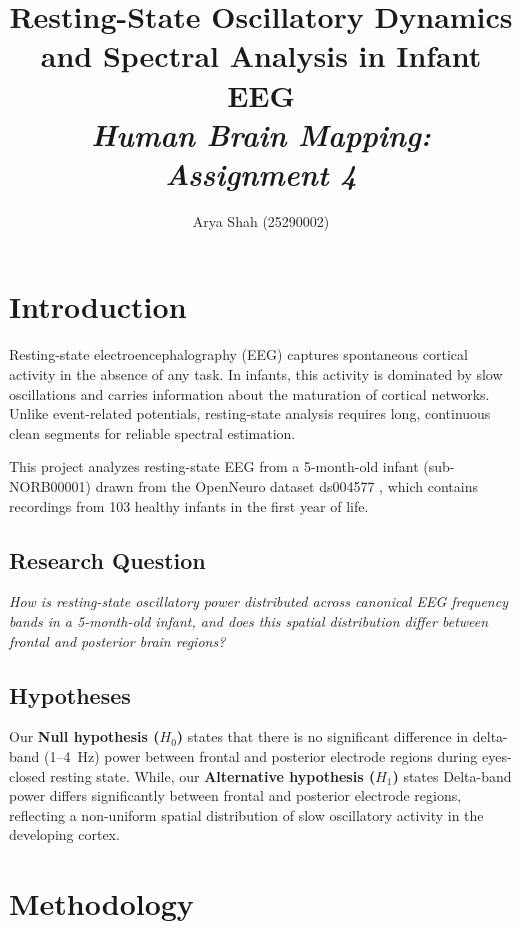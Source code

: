 \documentclass[10pt, a4paper, twocolumn]{article}
\title{\textbf{Resting-State Oscillatory Dynamics and Spectral Analysis in Infant EEG}\\[0.3em]
{\small \textit{Human Brain Mapping: Assignment 4 }}}
\author{Arya Shah (25290002)}
\date{}
\begin{document}
\maketitle

\section{Introduction}

Resting-state electroencephalography (EEG) captures spontaneous cortical activity in the absence of any task. In infants, this activity is dominated by slow oscillations and carries information about the maturation of cortical networks. Unlike event-related potentials, resting-state analysis requires long, continuous clean segments for reliable spectral estimation.

This project analyzes resting-state EEG from a 5-month-old infant (sub-NORB00001) drawn from the OpenNeuro dataset ds004577 \citep{schaworonkow2024}, which contains recordings from 103 healthy infants in the first year of life.

\subsection{Research Question}

\textit{How is resting-state oscillatory power distributed across canonical EEG frequency bands in a 5-month-old infant, and does this spatial distribution differ between frontal and posterior brain regions?}

\subsection{Hypotheses}
Our \textbf{Null hypothesis ($H_0$)} states that there is no significant difference in delta-band (1--4~Hz) power between frontal and posterior electrode regions during eyes-closed resting state. While, our \textbf{Alternative hypothesis ($H_1$)} states Delta-band power differs significantly between frontal and posterior electrode regions, reflecting a non-uniform spatial distribution of slow oscillatory activity in the developing cortex.

\section{Methodology}
\end{document}
